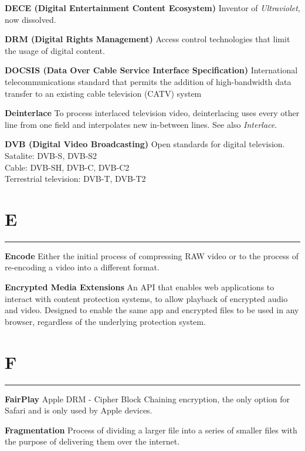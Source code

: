 \smallskip
\textbf{DECE (Digital Entertainment Content Ecosystem)}
Inventor of \textit{Ultraviolet}, now dissolved.

\smallskip
\textbf{DRM (Digital Rights Management)}
Access control technologies that limit the usage of digital content.

\smallskip
\textbf{DOCSIS (Data Over Cable Service Interface Specification)}
International telecommunications standard that permits the addition of high-bandwidth data transfer to an existing cable television (CATV) system

\smallskip
\textbf{Deinterlace}
To process interlaced television video, deinterlacing uses every other line from one field and interpolates new in-between lines. See also \textit{Interlace}.

\smallskip
\textbf{DVB (Digital Video Broadcasting)}
Open standards for digital television.\\
Satalite: DVB-S, DVB-S2\\
Cable: DVB-SH, DVB-C, DVB-C2\\
Terrestrial television: DVB-T, DVB-T2

\section{E}
\hrule

\medskip
\textbf{Encode}
Either the initial process of compressing RAW video or to the process of re-encoding a video into a different format.

\smallskip
\textbf{Encrypted Media Extensions}
An API that enables web applications to interact with content protection systems, to allow playback of encrypted audio and video. Designed to enable the same app and encrypted files to be used in any browser, regardless of the underlying protection system.

\section{F}
\hrule

\medskip
\textbf{FairPlay}
Apple DRM - Cipher Block Chaining encryption, the only option for Safari and is only used by Apple devices.

\smallskip
\textbf{Fragmentation}
Process of dividing a larger file into a series of smaller files with the purpose of delivering them over the internet.

